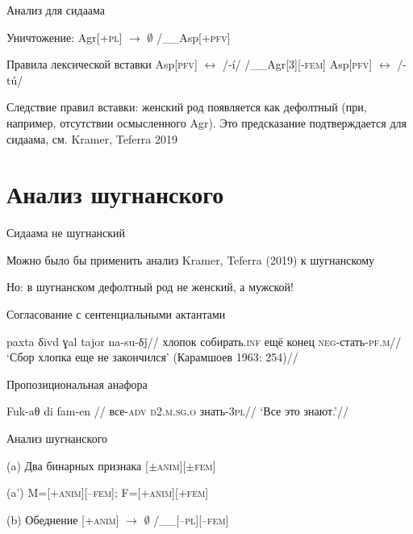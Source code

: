 \documentclass[xcolor=table]{beamer}
\begin{document}
\begin{frame}{Анализ для сидаама}

	Уничтожение: Agr[\textsc{+pl}] $\rightarrow$ $\emptyset$ /\_\_Asp[\textsc{+pfv}]

	\pex Правила лексической вставки
		\a Asp[\textsc{pfv}] $\leftrightarrow$ /-í/ /\_\_Agr[3][\textsc{-fem}]
		\a Asp[\textsc{pfv}] $\leftrightarrow$ /-tú/
	\xe

	Следствие правил вставки: женский род появляется как дефолтный (при, например, отсутствии осмысленного Agr). Это предсказание подтверждается для сидаама, см. Kramer, Teferra 2019

\end{frame}

\section{Анализ шугнанского}

\begin{frame}{Сидаама не шугнанский}

	Можно было бы применить анализ Kramer, Teferra (2019) к шугнанскому

	Но: в шугнанском дефолтный род не женский, а мужской!

\end{frame}

\begin{frame}{Согласование с сентенциальными актантами}

	\ex
		\begingl
			\gla paxta δīvd 		ɣal tajor na-su-δǰ//
			\glb хлопок собирать.\textsc{inf} 	ещё конец \textsc{neg}-стать-\textsc{pf.m}//
			\glft ‘Сбор хлопка еще не закончился’ (Карамшоев 1963: 254)//
		\endgl
	\xe

\end{frame}

\begin{frame}{Пропозициональная анафора}

	\ex
		\begingl
			\gla Fuk-aθ        	di   fam-en //       
			\glb все-\textsc{adv}   \textsc{d2.m.sg.o} знать-\textsc{3pl}//
			\glft `Все это знают.’//
		\endgl
	\xe

\end{frame}

\begin{frame}{Анализ шугнанского}

	(a) Два бинарных признака [$\pm$\textsc{anim}][$\pm$\textsc{fem}]

	(a') M=[+\textsc{anim}][--\textsc{fem}]; F=[+\textsc{anim}][+\textsc{fem}]

	(b) Обеднение [+\textsc{anim}] $\rightarrow$ $\emptyset$ /\_\_[--\textsc{pl}][--\textsc{fem}]

\end{frame}
\end{document}
